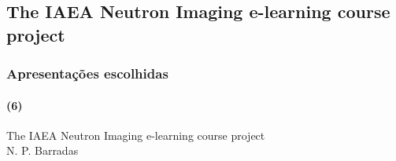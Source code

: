 \documentclass[svgnames,smaller,table]{beamer}
\begin{document}
\begin{frame}
  
\end{frame}
\begin{frame}
  
\end{frame}
\begin{frame}
  
\end{frame}
\begin{frame}
  
\end{frame}
\begin{frame}
  
\end{frame}
\begin{frame}
  
\end{frame}
\begin{frame}
  
\end{frame}
\begin{frame}
  
\end{frame}
\begin{frame}
  
\end{frame}
\begin{frame}
  
\end{frame}
\begin{frame}
  
\end{frame}
\begin{frame}
  
\end{frame}
\begin{frame}
  
\end{frame}
\begin{frame}
  
\end{frame}

\subsection{The IAEA Neutron Imaging e-learning course project}
\begin{frame}
  \frametitle{Apresentações escolhidas}
  \framesubtitle{(6)}
  \begin{center}
    The IAEA Neutron Imaging e-learning course project\\
    \vspace{2.0cm}
    N. P. Barradas
  \end{center}
\end{frame}
\end{document}
